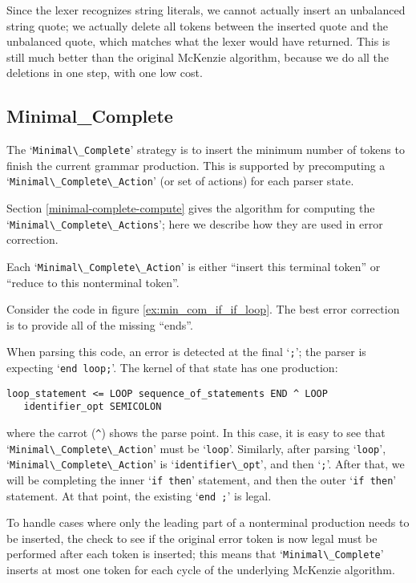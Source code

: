 \documentclass{article}
\newcommand{\code}[1]{`\lstinline|#1|'}
\begin{document}
Since the lexer recognizes string literals, we cannot actually insert
an unbalanced string quote; we actually delete all tokens between the
inserted quote and the unbalanced quote, which matches what the lexer
would have returned. This is still much better than the original
McKenzie algorithm, because we do all the deletions in one step, with
one low cost.

\subsection{Minimal\_Complete}
The \code{Minimal\_Complete} strategy is to insert the minimum number
of tokens to finish the current grammar production. This is supported
by precomputing a \code{Minimal\_Complete\_Action} (or set of actions)
for each parser state.

Section \ref{minimal-complete-compute} gives the algorithm for
computing the\\ \code{Minimal\_Complete\_Actions}; here we describe how
they are used in error correction.

Each \code{Minimal\_Complete\_Action} is either ``insert this terminal
token'' or ``reduce to this nonterminal token''.

Consider the code in figure \ref{ex:min_com_if_if_loop}. The best error
correction is to provide all of the missing ``ends''.

When parsing this code, an error is detected at the final \code{;};
the parser is expecting \code{end loop;}. The kernel of that state has
one production:
\begin{verbatim}
loop_statement <= LOOP sequence_of_statements END ^ LOOP
   identifier_opt SEMICOLON
\end{verbatim}
where the carrot (\verb|^|) shows the parse point. In this case, it is
easy to see that \code{Minimal\_Complete\_Action} must be \code{loop}.
Similarly, after parsing \code{loop}, \code{Minimal\_Complete\_Action}
is \code{identifier\_opt}, and then \code{;}. After that, we will be
completing the inner \code{if then} statement, and then the outer
\code{if then} statement. At that point, the existing \code{end ;} is
legal.

To handle cases where only the leading part of a nonterminal
production needs to be inserted, the check to see if the original
error token is now legal must be performed after each token is
inserted; this means that \code{Minimal\_Complete} inserts at most one
token for each cycle of the underlying McKenzie algorithm.
\end{document}
